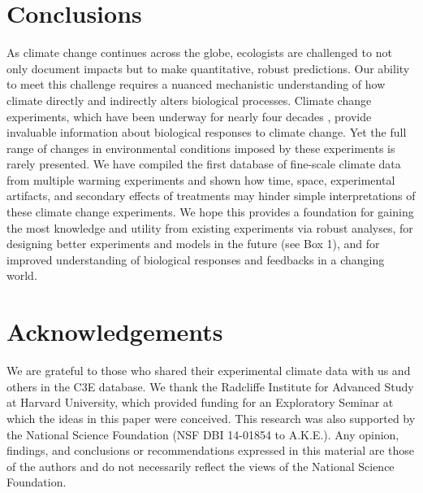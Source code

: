 \documentclass{article}
\begin{document}
\section* {Conclusions}
\par As climate change continues across the globe, ecologists are challenged to not only document impacts but to make quantitative, robust predictions. Our ability to meet this challenge requires a nuanced mechanistic understanding of how climate directly and indirectly alters biological processes. Climate change experiments, which have been underway for nearly four decades \citep[e.g.,][]{tamaki1981,carlson1982,melillo2017}, provide invaluable information about biological responses to climate change. Yet the full range of changes in environmental conditions imposed by these experiments is rarely presented. We have compiled the first database of fine-scale climate data from multiple warming experiments and shown how time, space, experimental artifacts, and secondary effects of treatments may hinder simple interpretations of these climate change experiments. We hope this provides a foundation for gaining the most knowledge and utility from existing experiments via robust analyses, for designing better experiments and models in the future (see Box 1), and for improved understanding of biological responses and feedbacks in a changing world.
 \section* {Acknowledgements}
We are grateful to those who shared their experimental climate data with us and others in the C3E database. We thank the Radcliffe Institute for Advanced Study at Harvard University, which provided funding for an Exploratory Seminar at which the ideas in this paper were conceived. This research was also supported by the National Science Foundation (NSF DBI 14-01854 to A.K.E.). Any opinion, findings, and conclusions or recommendations expressed in this material are those of the authors and do not necessarily reflect the views of the National Science Foundation.
\end{document}
